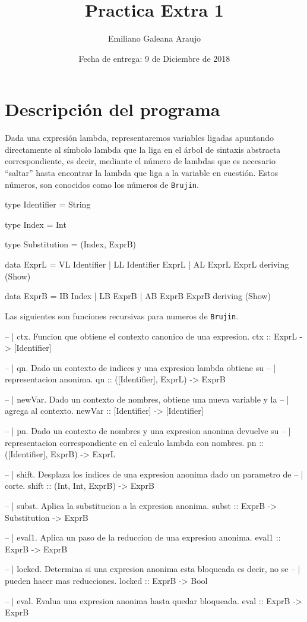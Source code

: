 \documentclass[spanish,12pt,letterpaper]{article}
\title{Practica Extra 1}
\author{Emiliano Galeana Araujo}
\affil{Facultad de Ciencias, UNAM}
\date{Fecha de entrega: 9 de Diciembre de 2018}
\begin{document}
\maketitle

\section{Descripción del programa}
Dada una expresión lambda, representaremos variables ligadas apuntando
directamente al símbolo lambda que la liga en el árbol de sintaxis abstracta
correspondiente, es decir, mediante el número de lambdas que es necesario
``saltar'' hasta encontrar la lambda que liga a la variable en cuestión. Estos
números, son conocidos como los números de \texttt{Brujin}.

\begin{code}
  type Identifier = String

  type Index = Int

  type Substitution = (Index, ExprB)

  data ExprL = VL Identifier
             | LL Identifier ExprL
             | AL ExprL ExprL deriving (Show)

  data ExprB = IB Index
             | LB ExprB
             | AB ExprB ExprB deriving (Show)
\end{code}

Las siguientes son funciones recursivas para numeros de \texttt{Brujin}.

\begin{code}
  -- | ctx. Funcion que obtiene el contexto canonico de una expresion.
  ctx :: ExprL -> [Identifier]

  -- | qn. Dado un contexto de indices y una expresion lambda obtiene su
  -- |     representacion anonima.
  qn :: ([Identifier], ExprL) -> ExprB

  -- | newVar. Dado un contexto de nombres, obtiene una nueva variable y la
  -- |         agrega al contexto.
  newVar :: [Identifier] -> [Identifier]

  -- | pn. Dado un contexto de nombres y una expresion anonima devuelve su
  -- |     representacion correspondiente en el calculo lambda con nombres.
  pn :: ([Identifier], ExprB) -> ExprL

  -- | shift. Desplaza los indices de una expresion anonima dado un parametro de
  -- |        corte.
  shift :: (Int, Int, ExprB) -> ExprB

  -- | subst. Aplica la substitucion a la expresion anonima.
  subst :: ExprB -> Substitution -> ExprB

  -- | eval1. Aplica un paso de la reduccion de una expresion anonima.
  eval1 :: ExprB -> ExprB

  -- | locked. Determina si una expresion anonima esta bloqueada es decir, no se
  -- |         pueden hacer mas reducciones.
  locked :: ExprB -> Bool

  -- | eval. Evalua una expresion anonima hasta quedar bloqueada.
  eval :: ExprB -> ExprB


\end{code}
\end{document}
